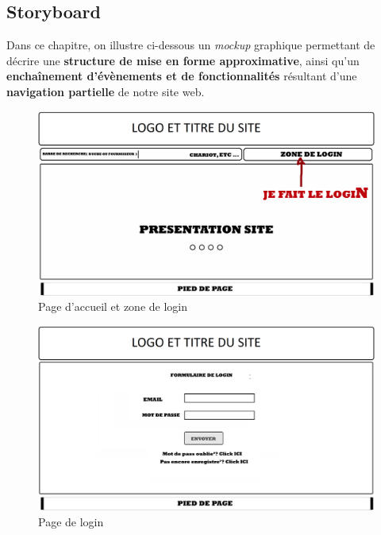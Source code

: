 \documentclass[a4paper,12pt]{report}
\theoremstyle{break}
\theoremstyle{break}
\theoremstyle{break}
\theoremstyle{break}
\theoremstyle{definition}
\theoremstyle{remark}
\begin{document}
\begin{appendices}
\chapter{Storyboard}
\label{app:storyoard}
Dans ce chapitre, on illustre ci-dessous un \textit{mockup} graphique permettant de décrire une \textbf{structure de mise en forme approximative}, ainsi qu'un \textbf{enchaînement d'évènements et de fonctionnalités} résultant d'une \textbf{navigation partielle} de notre site web.

\begin{figure}[!ht]
  \centering
  \includegraphics[scale=0.25]{images/storyboard/00.jpg}
  \caption{Page d'accueil et zone de login}
\end{figure}

\begin{figure}[!ht]
  \centering
  \includegraphics[scale=0.25]{images/storyboard/01.jpg}
  \caption{Page de login}
\end{figure}


\end{appendices}
\end{document}
